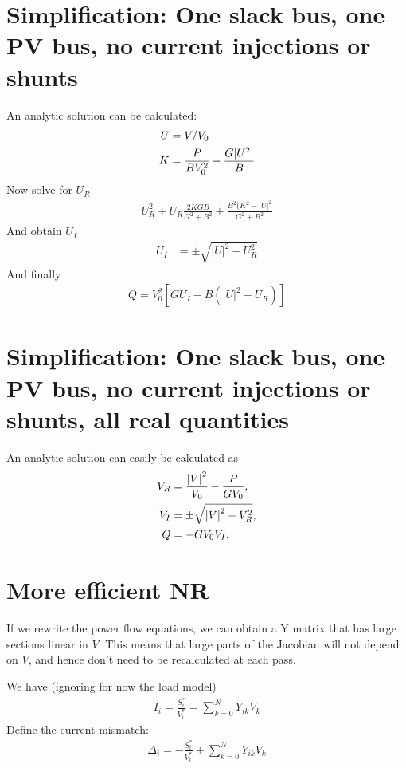 \documentclass[11pt]{article}
\begin{document}
\section{Simplification: One slack bus, one PV bus, no current injections or shunts}
An analytic solution can be calculated:
\begin{align}
	U &= V/V_0 \notag \\
	K &= \frac{P}{BV_0^2}-\frac{G|U^2|}{B}
\end{align}
Now solve for $U_R$
\begin{align}
	U_R^2 + U_R\frac{2KGB}{G^2 + B^2}+\frac{B^2(K^2-|U|^2}{G^2+B^2}
\end{align}
And obtain $U_I$
\begin{align}
	U_I &= \pm\sqrt{|U|^2-U_R^2} 
\end{align}
And finally
\begin{align}
	Q = V_0^2\left[GU_I-B(|U|^2-U_R)\right]
\end{align}
\section{Simplification: One slack bus, one PV bus, no current injections or shunts, all real quantities}
An analytic solution can easily be calculated as
\begin{align}
	V_R &= \frac{\left|V\right|^2}{V_0}-\frac{P}{GV_0} ,\notag \\
	V_I &= \pm\sqrt{\left|V\right|^2 - V_R^2}, \notag \\
	Q &= -GV_0V_I.
\end{align}
\section{More efficient NR}
If we rewrite the power flow equations, we can obtain a Y matrix that has large sections linear in $V$. This means that large parts of the Jacobian will not depend on $V$, and hence don't need to be recalculated at each pass.

We have (ignoring for now the load model)
\begin{align}
I_i = \frac{S_i^*}{V_i^*} = \sum_{k=0}^NY_{ik}V_k
\end{align}
Define the current mismatch:
\begin{align}
\Delta_i = -\frac{S^*_i}{V_i^*} + \sum_{k=0}^NY_{ik}V_k
\end{align}
\end{document}
